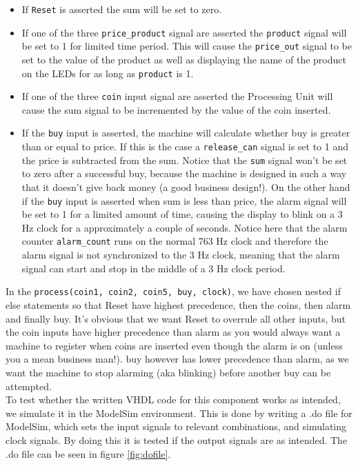 \begin{itemize}
\item If \texttt{Reset} is asserted the sum will be set to zero.
\item If one of the three \texttt{price\_product} signal are asserted the \texttt{product} signal will be set to 1 for limited time period. This will cause the \texttt{price\_out} signal to be set to the value of the product as well as displaying the name of the product on the LEDs for as long as \texttt{product} is 1.
\item If one of the three \texttt{coin} input signal are asserted the Processing Unit will cause the sum signal to be incremented by the value of the coin inserted.
\item If the \texttt{buy} input is asserted, the machine will calculate whether buy is greater than or equal to price. If this is the case a \texttt{release\_can} signal is set to 1 and the price is subtracted from the sum. Notice that the \texttt{sum} signal won't be set to zero after a successful buy, because the machine is designed in such a way that it doesn't give back money (a good business design!). On the other hand if the \texttt{buy} input is asserted when sum is less than price, the alarm signal will be set to 1 for a limited amount of time, causing the display to blink on a 3 Hz clock for a approximately a couple of seconds. Notice here that the alarm counter \texttt{alarm\_count} runs on the normal 763 Hz clock and therefore the alarm signal is not synchronized to the 3 Hz clock, meaning that the alarm signal can start and stop in the middle of a 3 Hz clock period.
\end{itemize}

In the \texttt{process(coin1, coin2, coin5, buy, clock)}, we have chosen nested if else statements so that Reset have highest precedence, then the coins, then alarm and finally buy. It's obvious that we want Reset to overrule all other inputs, but the coin inputs have higher precedence than alarm as you would always want a machine to register when coins are inserted even though the alarm is on (unless you a mean business man!). buy however has lower precedence than alarm, as we want the machine to stop alarming (aka blinking) before another buy can be attempted. \\

To test whether the written VHDL code for this component works as intended, we simulate it in the ModelSim environment. This is done by writing a .do file for ModelSim, which sets the input signals to relevant combinations, and simulating clock signals. By doing this it is tested if the output signals are as intended. The .do file can be seen in figure \ref{fig:dofile}.


